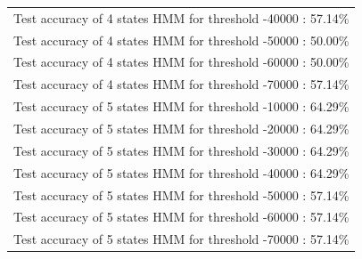 \begin{table}[H]
\begin{tabular}{l}
    Test accuracy of 4 states HMM for threshold -40000 : 57.14\% \\
    Test accuracy of 4 states HMM for threshold -50000 : 50.00\% \\
    Test accuracy of 4 states HMM for threshold -60000 : 50.00\% \\
    Test accuracy of 4 states HMM for threshold -70000 : 57.14\% \\
    Test accuracy of 5 states HMM for threshold -10000 : 64.29\% \\
    Test accuracy of 5 states HMM for threshold -20000 : 64.29\% \\
    Test accuracy of 5 states HMM for threshold -30000 : 64.29\% \\
    Test accuracy of 5 states HMM for threshold -40000 : 64.29\% \\
    Test accuracy of 5 states HMM for threshold -50000 : 57.14\% \\
    Test accuracy of 5 states HMM for threshold -60000 : 57.14\% \\
    Test accuracy of 5 states HMM for threshold -70000 : 57.14\% \\
\bottomrule

\end{tabular}
\end{table}




 
